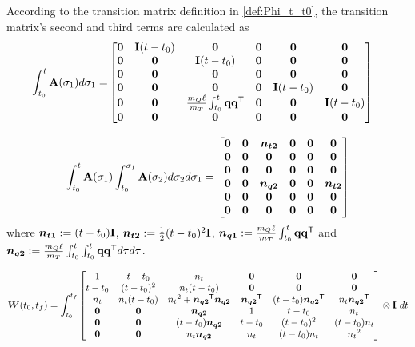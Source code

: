 \documentclass[journal,onecolumn]{IEEEtran}
\begin{document}
According to the transition matrix definition in \eqref{def:Phi_t_t0},  the transition matrix's second and third terms are calculated as
%
\begin{align}
	\int_{t_0}^t{\mathbf A}(\sigma_1)d\sigma_1= 
	&\begin{bmatrix}
			{\bf 0}  & {\bf I}(t-t_0) & {\bf 0} & {\bf 0} & {\bf 0} & {\bf 0}\\
			{\bf 0}  & {\bf 0} & {\bf I}(t-t_0) & {\bf 0} & {\bf 0} & {\bf 0}\\
			{\bf 0}  & {\bf 0} & {\bf 0} & {\bf 0} & {\bf 0} & {\bf 0}\\
			{\bf 0}  & {\bf 0} & {\bf 0} & {\bf 0} & {\bf I}(t-t_0) & {\bf 0}\\
			{\bf 0}  & {\bf 0} & \frac{\mQ\ell}{\mT}\int_{t_0}^t\dir\dir[T] & {\bf 0} & {\bf 0} & {\bf I}(t-t_0)\\
			{\bf 0}  & {\bf 0} & {\bf 0} & {\bf 0} & {\bf 0} & {\bf 0}
		\end{bmatrix}
\end{align}

\begin{align}
	\int_{t_0}^t{\mathbf A}(\sigma_1)\int_{t_0}^{\sigma_1}{\mathbf A}(\sigma_2)d\sigma_2d\sigma_1=
	\begin{bmatrix}
			{\bf 0}  & {\bf 0} & \boldsymbol{n_{t2}} & {\bf 0} & {\bf 0} & {\bf 0}\\
			{\bf 0}  & {\bf 0} & {\bf 0} & {\bf 0} & {\bf 0} & {\bf 0}\\
			{\bf 0}  & {\bf 0} & {\bf 0} & {\bf 0} & {\bf 0} & {\bf 0}\\
			{\bf 0}  & {\bf 0} & \boldsymbol{n_{q2}} & {\bf 0} & {\bf 0} & \boldsymbol{n_{t2}}\\
			{\bf 0}  & {\bf 0} & {\bf 0} & {\bf 0} & {\bf 0} & {\bf 0}\\
			{\bf 0}  & {\bf 0} & {\bf 0} & {\bf 0} & {\bf 0} & {\bf 0}
		\end{bmatrix}
\end{align}
where $\boldsymbol{n_{t1}}:=(t-t_0){\bf I}$, $\boldsymbol{n_{t2}}:=\frac{1}{2}(t-t_0)^2{\bf I}$, $\bs{n_{q1}}:=\frac{\mQ\ell}{\mT}\int_{t_0}^t\dir\dir[T]$ and
$\bs{n_{q2}}:=\frac{\mQ\ell}{\mT}\int_{t_0}^t\int_{t_0}^t\dir\dir[T]d\tau d\tau$.

	\begin{align}
		\boldsymbol{W}(t_0,t_f)=\int_{t_0}^{t_f}
		\begin{bmatrix}
			1  & t-t_0 & n_t  & {\bf 0} & {\bf 0} & {\bf 0} \\
			t-t_0 & (t-t_0)^2 & n_t(t-t_0) & {\bf 0} & {\bf 0} & {\bf 0} \\
			n_t & n_t(t-t_0) & {n_t}^2+\boldsymbol{n_{q2}}^\mathsf{T}\boldsymbol{n_{q2}} & \boldsymbol{n_{q2}}^\mathsf{T} & (t-t_0)\boldsymbol{n_{q2}}^\mathsf{T} & n_t\boldsymbol{n_{q2}}^\mathsf{T}\\
			{\bf 0} & {\bf 0} & \boldsymbol{n_{q2}}  & 1  & t-t_0 & n_t\\
			{\bf 0} & {\bf 0} & (t-t_0)\boldsymbol{n_{q2}} & t-t_0 & (t-t_0)^2 & (t-t_0)n_t\\
			{\bf 0} & {\bf 0} & n_t\boldsymbol{n_{q2}} & n_t & (t-t_0)n_t & {n_t}^2
		\end{bmatrix}\otimes {\bf I}~dt
		\label{eq:W_t0_tf}
	\end{align}
\end{document}

